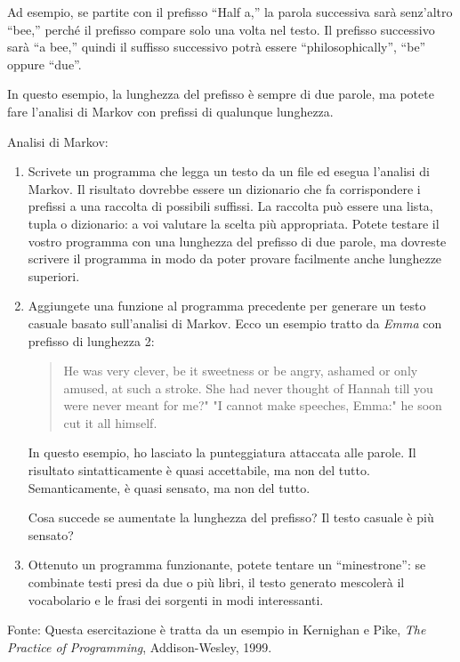 \documentclass[10pt]{book}
\begin{document}
Ad esempio, se partite con il prefisso ``Half a,'' la parola successiva sarà senz'altro ``bee,'' perché il prefisso compare solo una volta nel testo. Il prefisso successivo sarà ``a bee,'' quindi il suffisso successivo potrà essere ``philosophically'', ``be'' oppure ``due''.

In questo esempio, la lunghezza del prefisso è sempre di due parole, ma potete fare l'analisi di Markov con prefissi di qualunque lunghezza.

\vspace{0.2in}
\begin{exercise}

Analisi di Markov:

\begin{enumerate}

\item Scrivete un programma che legga un testo da un file ed esegua l'analisi di Markov. Il risultato dovrebbe essere un dizionario che fa corrispondere i prefissi a una raccolta di possibili suffissi. La raccolta può essere una lista, tupla o dizionario: a voi valutare la scelta più appropriata. Potete testare il vostro programma con una lunghezza del prefisso di due parole, ma dovreste scrivere il programma in modo da poter provare facilmente anche lunghezze superiori.

\item Aggiungete una funzione al programma precedente per generare un testo casuale basato sull'analisi di Markov. Ecco un esempio tratto da {\em Emma} con prefisso di lunghezza 2: 

\begin{quote}
He was very clever, be it sweetness or be angry, ashamed or only
amused, at such a stroke. She had never thought of Hannah till you
were never meant for me?" "I cannot make speeches, Emma:" he soon cut
it all himself.
\end{quote}

In questo esempio, ho lasciato la punteggiatura attaccata alle parole. Il risultato sintatticamente è quasi accettabile, ma non del tutto. Semanticamente, è quasi sensato, ma non del tutto.

Cosa succede se aumentate la lunghezza del prefisso? Il testo casuale è più sensato?

\item Ottenuto un programma funzionante, potete tentare un ``minestrone'': se combinate testi presi da due o più libri, il testo generato mescolerà il vocabolario e le frasi dei sorgenti in modi interessanti.

\end{enumerate}

Fonte: Questa esercitazione è tratta da un esempio in Kernighan e
Pike, {\em The Practice of Programming}, Addison-Wesley, 1999.

\end{exercise}
\end{document}
